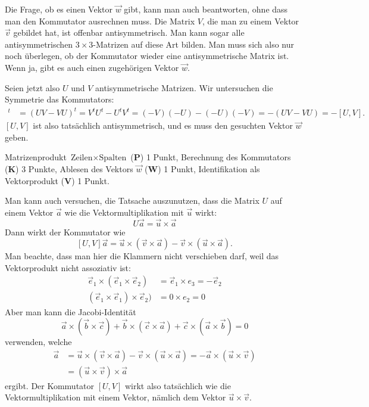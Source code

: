 \begin{diskussion}
Die Frage, ob es einen Vektor $\vec w$ gibt, kann man auch beantworten,
ohne dass man den Kommutator ausrechnen muss. Die Matrix $V$, die man zu
einem Vektor $\vec v$ gebildet hat, ist offenbar antisymmetrisch.
Man kann sogar alle antisymmetrischen $3\times 3$-Matrizen auf diese
Art bilden. Man muss sich also nur noch überlegen, ob der Kommutator
wieder eine antisymmetrische Matrix ist. Wenn ja, gibt es auch einen
zugehörigen Vektor $\vec w$.

Seien jetzt also $U$ und $V$ antisymmetrische Matrizen. Wir untersuchen
die Symmetrie das Kommutators:
\begin{align*}
[U,V]^t
&=
(UV-VU)^t
=
V^tU^t-U^tV^t
=
(-V)(-U)-(-U)(-V)
=
-(UV-VU)
=
-[U,V].
\end{align*}
$[U,V]$ ist also tatsächlich antisymmetrisch, und es muss den gesuchten
Vektor $\vec w$ geben.
\end{diskussion}

\begin{bewertung}
Matrizenprodukt $\text{Zeilen}\times \text{Spalten}$ ({\bf P}) 1 Punkt,
Berechnung des Kommutators ({\bf K}) 3 Punkte,
Ablesen des Vektors $\vec w$ ({\bf W}) 1 Punkt,
Identifikation als Vektorprodukt ({\bf V}) 1 Punkt.
\end{bewertung}

\begin{diskussion}
Man kann auch versuchen, die Tatsache auszunutzen, dass die Matrix $U$
auf einem Vektor $\vec a$ wie die Vektormultiplikation mit $\vec u$
wirkt:
\[
U\vec a=\vec u\times \vec a
\]
Dann wirkt der Kommutator wie
\[
[U,V]\vec a
=
\vec u\times (\vec v\times \vec a)-\vec v\times(\vec u\times \vec a).
\]
Man beachte, dass man hier die Klammern nicht verschieben darf, weil
das Vektorprodukt nicht assoziativ ist:
\begin{align*}
\vec e_1\times(\vec e_1\times\vec e_2)&=\vec e_1\times e_3=-\vec e_2\\
(\vec e_1\times\vec e_1)\times\vec e_2)&=0\times e_2=0
\end{align*}
Aber man kann die Jacobi-Identität
\[
\vec a\times(\vec b\times \vec c)
+
\vec b\times(\vec c\times \vec a)
+
\vec c\times(\vec a\times \vec b)
=
0
\]
verwenden, welche
\begin{align*}
[U,V]\vec a
&=
\vec u\times (\vec v\times \vec a)-\vec v\times(\vec u\times \vec a)
=
-\vec a\times(\vec u\times \vec v)
\\
&=
(\vec u\times \vec v)\times\vec a
\end{align*}
ergibt.
Der Kommutator $[U,V]$ wirkt also tatsächlich wie die Vektormultiplikation
mit einem Vektor, nämlich dem Vektor $\vec u\times \vec v$.
\end{diskussion}



